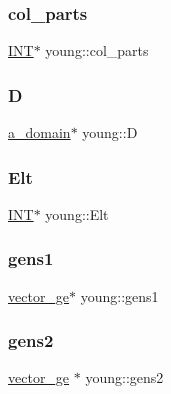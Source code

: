 \subsubsection{\texorpdfstring{col\+\_\+parts}{col\_parts}}
{\footnotesize\ttfamily \mbox{\hyperlink{galois_8h_a09fddde158a3a20bd2dcadb609de11dc}{I\+NT}}$\ast$ young\+::col\+\_\+parts}

\mbox{\label{classyoung_a3c0a311662ed89e7f2f08063ca43c6c6}} 
\subsubsection{\texorpdfstring{D}{D}}
{\footnotesize\ttfamily \mbox{\hyperlink{classa__domain}{a\+\_\+domain}}$\ast$ young\+::D}

\mbox{\label{classyoung_a4119fa135642a56b1eb1dfa0b172c998}} 
\subsubsection{\texorpdfstring{Elt}{Elt}}
{\footnotesize\ttfamily \mbox{\hyperlink{galois_8h_a09fddde158a3a20bd2dcadb609de11dc}{I\+NT}}$\ast$ young\+::\+Elt}

\mbox{\label{classyoung_abf7a41998c8722217dee8aff5a7f56e9}} 
\subsubsection{\texorpdfstring{gens1}{gens1}}
{\footnotesize\ttfamily \mbox{\hyperlink{classvector__ge}{vector\+\_\+ge}}$\ast$ young\+::gens1}

\mbox{\label{classyoung_aefbc66e2577e6952604398b9cd5ac887}} 
\subsubsection{\texorpdfstring{gens2}{gens2}}
{\footnotesize\ttfamily \mbox{\hyperlink{classvector__ge}{vector\+\_\+ge}} $\ast$ young\+::gens2}

\mbox{\label{classyoung_a61a29c4ab45286e92057f7f0a0f39c81}} 
